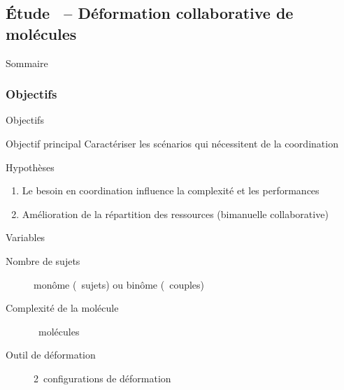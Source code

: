 \documentclass[english,french,dvips,10pt]{mybeamer}
\begin{document}
	\subsection{Étude~ -- Déformation collaborative de molécules}
	\begin{myframe}{Sommaire}
		\tableofcontents[sectionstyle=show/shaded,subsectionstyle=show/shaded/hide,subsubsectionstyle=show/show/hide]
	\end{myframe}
	\subsubsection{Objectifs}
	\begin{myframe}{Objectifs}
		\begin{myblock}{Objectif principal}
			Caractériser les scénarios qui nécessitent de la coordination
		\end{myblock}
		\begin{myplusblock}{Hypothèses}
			\begin{enumerate}
				\item Le besoin en coordination influence la complexité et les performances
				\item Amélioration de la répartition des ressources (bimanuelle \myvs collaborative)
			\end{enumerate}
		\end{myplusblock}
		\begin{myblock}{Variables}
			\begin{description}
				\item[Nombre de sujets] monôme (~sujets) ou binôme (~couples)
				\item[Complexité de la molécule] ~molécules
				\item[Outil de déformation] 2~configurations de déformation
			\end{description}
		\end{myblock}
	\end{myframe}
\end{document}
